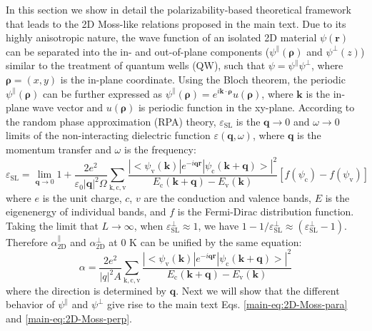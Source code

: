 \documentclass[manuscript=suppinfo,email=true,hyperref=true,keywords=false]{achemso}
\begin{document}
In this section we show in detail the polarizability-based theoretical
framework that leads to the 2D Moss-like relations proposed in the
main text.  Due to its highly anisotropic nature, the wave function of
an isolated 2D material $\psi(\mathbf{r})$ can be separated into the
in- and out-of-plane components ($\psi^{\parallel}(\boldsymbol{\rho})$ and $\psi^{\perp}(z)$) 
similar to the treatment of quantum
wells (QW),\cite{davies_physics_1997} such that
$\psi=\psi^{\parallel}\psi^{\perp}$, where $\boldsymbol{\rho}=(x, y)$
is the in-plane coordinate. Using the Bloch theorem, the periodic
$\psi^{\parallel}(\boldsymbol{\rho})$ can be further expressed as
$\psi^{\parallel}(\boldsymbol{\rho})=e^{i\mathbf{k} \cdot
  \boldsymbol{\rho}}u(\boldsymbol{\rho})$, where $\mathbf{k}$ is the
in-plane wave vector and $u(\boldsymbol{\rho})$ is periodic function
in the xy-plane. According to the random phase approximation (RPA)
theory\cite{Adler_1962}, $\varepsilon_{\mathrm{SL}}$ is the
$\mathbf{q} \to 0$ and $\omega \to 0$ limits of the non-interacting
dielectric function $\varepsilon(\mathbf{q}, \omega)$, where
$\mathbf{q}$ is the momentum transfer and $\omega$ is the frequency:
\begin{equation}
  \label{eq:RPA-eps2}
  \varepsilon_{\mathrm{SL}}
  = \lim_{\mathbf{q} \to 0} 1 + \frac{2e^{2}}{\varepsilon_{0} |\mathbf{q}|^{2} \Omega}
  \sum_{\mathrm{k, c, v}}
  \frac{|<\psi_{\mathrm{v}}(\mathbf{k})|e^{-i\mathbf{q}\mathbf{r}}|\psi_{\mathrm{c}}(\mathbf{k+q})>|^{2}}
  {E_{\mathrm{c}}(\mathbf{k+q}) - E_{\mathrm{v}}(\mathbf{k})}
  \left[f(\psi_{\mathrm{c}}) - f(\psi_{\mathrm{v}})\right]
\end{equation}
where $e$ is the unit charge, $c$, $v$ are the conduction and valence
bands, $E$ is the eigenenergy of individual bands, and $f$ is the
Fermi-Dirac distribution function. Taking the
limit that $L\to\infty$, when
$\varepsilon^{\perp}_{\mathrm{SL}} \approx 1$, we have
$1-1/\varepsilon^{\perp}_{\mathrm{SL}} \approx
(\varepsilon_{\mathrm{SL}}^{\perp} - 1)$. Therefore
$\alpha_{\mathrm{2D}}^{\parallel}$ and $\alpha_{\mathrm{2D}}^{\perp}$
at 0 K can be unified by the same equation:
\begin{equation}
  \label{eq:alpha-RPA}
  \alpha = \frac{2e^{2}}{|q|^{2}A} \sum_{\mathrm{k,c,v}}
  \frac{|<\psi_{\mathrm{v}}(\mathbf{k})|e^{-i\mathbf{q}\mathbf{r}}|\psi_{\mathrm{c}}(\mathbf{k+q})>|^{2}}
  {E_{\mathrm{c}}(\mathbf{k+q}) - E_{\mathrm{v}}(\mathbf{k})}
\end{equation}
where the direction is determined by $\mathbf{q}$. Next we will show
that the different behavior of $\psi^{\parallel}$ and $\psi^{\perp}$
give rise to the main text Eqs. \ref{main-eq:2D-Moss-para} and
\ref{main-eq:2D-Moss-perp}.
\end{document}
